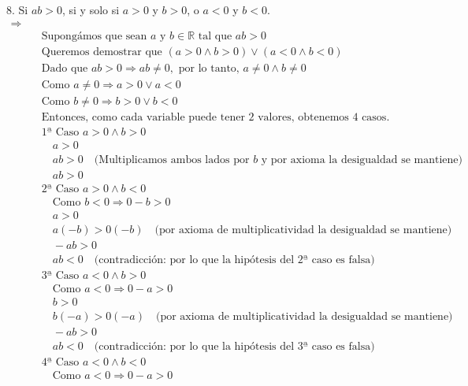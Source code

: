\documentclass{article}
\begin{document}
  8. Si \(ab>0\), si y solo si \(a>0\) y \(b>0\), o \(a<0\) y \(b<0\).\\
\begin{align*}
\text{$\Rightarrow$}\\
&\quad \text{Supongámos que sean } a \text{ y } b \in \mathbb{R} \text{ tal que } ab > 0 \\
&\quad \text{Queremos demostrar que } (a > 0 \land b > 0) \lor (a < 0 \land b < 0) \\
&\quad \text{Dado que } ab > 0 \Rightarrow ab \neq 0, \text{ por lo tanto, } a \neq 0 \land b \neq 0 \\
&\quad \text{Como } a \neq 0 \Rightarrow a > 0 \lor a < 0 \\
&\quad \text{Como } b \neq 0 \Rightarrow b > 0 \lor b < 0 \\
&\quad \text{Entonces, como cada variable puede tener 2 valores, obtenemos 4 casos.} \\
&\quad \text{1ª Caso } a > 0 \land b > 0 \\
&\quad \quad a > 0 \\
&\quad \quad ab > 0 \quad \text{(Multiplicamos ambos lados por \(b\) y por axioma la desigualdad se mantiene)} \\
&\quad \quad ab > 0 \\
&\quad \text{2ª Caso } a > 0 \land b < 0 \\
&\quad \quad \text{Como } b < 0 \Rightarrow 0 - b > 0 \\
&\quad \quad a > 0 \\
&\quad \quad a(-b) > 0(-b) \quad \text{(por axioma de multiplicatividad la desigualdad se mantiene)} \\
&\quad \quad -ab > 0 \\
&\quad \quad ab < 0 \quad \text{(contradicción: por lo que la hipótesis del 2ª caso es falsa)} \\
&\quad \text{3ª Caso } a < 0 \land b > 0 \\
&\quad \quad \text{Como } a < 0 \Rightarrow 0 - a > 0 \\
&\quad \quad b > 0 \\
&\quad \quad b(-a) > 0(-a) \quad \text{(por axioma de multiplicatividad la desigualdad se mantiene)} \\
&\quad \quad -ab > 0 \\
&\quad \quad ab < 0 \quad \text{(contradicción: por lo que la hipótesis del 3ª caso es falsa)} \\
&\quad \text{4ª Caso } a < 0 \land b < 0 \\
&\quad \quad \text{Como } a < 0 \Rightarrow 0 - a > 0 \\

\end{align*}
\end{document}
